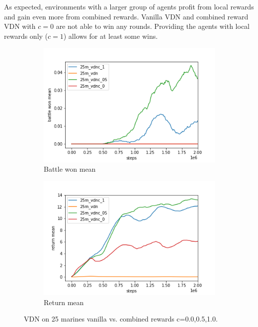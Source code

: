 As expected, environments with a larger group of agents profit from local rewards and gain even more from combined rewards. Vanilla VDN and combined reward VDN with $c=0$ are not able to win any rounds. Providing the agents with local rewards only ($c=1$) allows for at least some wins. 
\begin{figure}[h!]
	  \centering
	\begin{subfigure}[b]{0.49\textwidth}
		\includegraphics[width=\textwidth]{img/results/vdnc_25m/battle_won_mean.png}
		\caption{Battle won mean}
	\end{subfigure}
	\hfill
	\begin{subfigure}[b]{0.49\textwidth}
		\includegraphics[width=\textwidth]{img/results/vdnc_25m/return_mean.png}
		\caption{Return mean}
	\end{subfigure}

	\caption{VDN on 25 marines vanilla vs. combined rewards c=0.0,0.5,1.0.}
	\label{fig:vdn_25m_results}
\end{figure}


